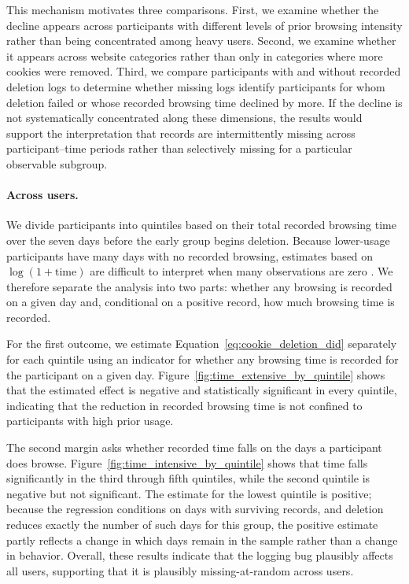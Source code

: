 \documentclass[12pt]{article}
\theoremstyle{definition}
\theoremstyle{remark}
\begin{document}
\begin{appendix}
This mechanism motivates three comparisons. First, we examine whether the decline appears across participants with different levels of prior browsing intensity rather than being concentrated among heavy users. Second, we examine whether it appears across website categories rather than only in categories where more cookies were removed. Third, we compare participants with and without recorded deletion logs to determine whether missing logs identify participants for whom deletion failed or whose recorded browsing time declined by more. If the decline is not systematically concentrated along these dimensions, the results would support the interpretation that records are intermittently missing across participant--time periods rather than selectively missing for a particular observable subgroup.

\paragraph{Across users.} We divide participants into quintiles based on their total recorded browsing time over the seven days before the early group begins deletion. Because lower-usage participants have many days with no recorded browsing, estimates based on $\log(1+\text{time})$ are difficult to interpret when many observations are zero \citep{chen2024logs}. We therefore separate the analysis into two parts: whether any browsing is recorded on a given day and, conditional on a positive record, how much browsing time is recorded.

For the first outcome, we estimate Equation~\eqref{eq:cookie_deletion_did} separately for each quintile using an indicator for whether any browsing time is recorded for the participant on a given day. Figure~\ref{fig:time_extensive_by_quintile} shows that the estimated effect is negative and statistically significant in every quintile, indicating that the reduction in recorded browsing time is not confined to participants with high prior usage.

The second margin asks whether recorded time falls on the days a participant does browse. Figure~\ref{fig:time_intensive_by_quintile} shows that time falls significantly in the third through fifth quintiles, while the second quintile is negative but not significant. The estimate for the lowest quintile is positive; because the regression conditions on days with surviving records, and deletion reduces exactly the number of such days for this group, the positive estimate partly reflects a change in which days remain in the sample rather than a change in behavior. Overall, these results indicate that the logging bug plausibly affects all users, supporting that it is plausibly missing-at-random across users.


\end{appendix}
\end{document}
